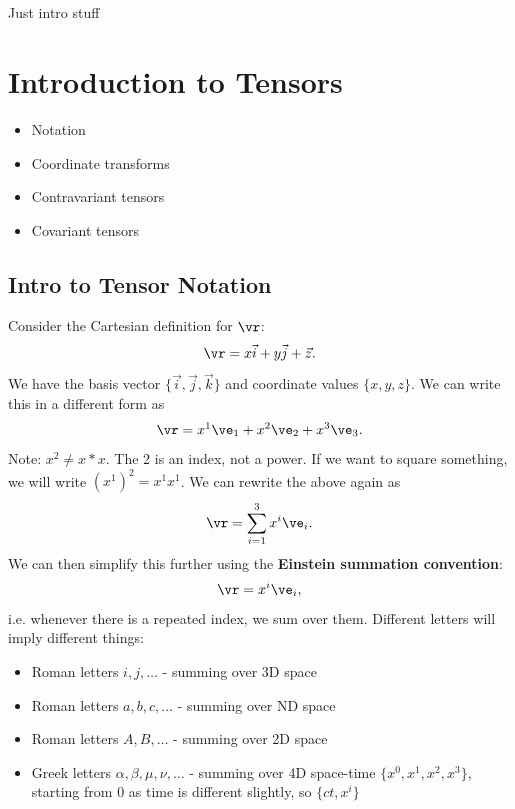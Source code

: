 \documentclass[a4paper, 11pt, normalem]{report}
\begin{document}
\chapter{}
Just intro stuff

\chapter{Introduction to Tensors}
\begin{itemize}
    \item Notation
    \item Coordinate transforms
    \item Contravariant tensors
    \item Covariant tensors
\end{itemize}

\section{Intro to Tensor Notation}
Consider the Cartesian definition for $\vr$:
\begin{align}
    \vr = x\vec{i} + y\vec{j} + \vec{z}.
\end{align}
We have the basis vector $\{\vec{i},\vec{j},\vec{k}\}$ and coordinate values $\{x,y,z\}$.
We can write this in a different form as
\begin{align}
    \vr = x^1\ve_1 + x^2\ve_2 + x^3\ve_3.
\end{align}
Note: $x^2 \neq x*x$.
The 2 is an index, not a power.
If we want to square something, we will write $(x^1)^2 = x^1x^1$.
We can rewrite the above again as
\begin{align}
    \vr = \sum_{i=1}^3 x^i\ve_i.
\end{align}
We can then simplify this further using the \textbf{Einstein summation convention}:
\begin{align}
    \vr = x^i\ve_i,
\end{align}
i.e. whenever there is a repeated index, we sum over them.
Different letters will imply different things:
\begin{itemize}
    \item Roman letters $i,j,\dots$ - summing over 3D space
    \item Roman letters $a,b,c,\dots$ - summing over ND space
    \item Roman letters $A,B,\dots$ - summing over 2D space
    \item Greek letters $\alpha,\beta,\mu,\nu,\dots$ - summing over 4D space-time $\{x^0,x^1,x^2,x^3\}$, starting from 0 as time is different slightly, so $\{ct,x^i\}$
\end{itemize}
\end{document}
